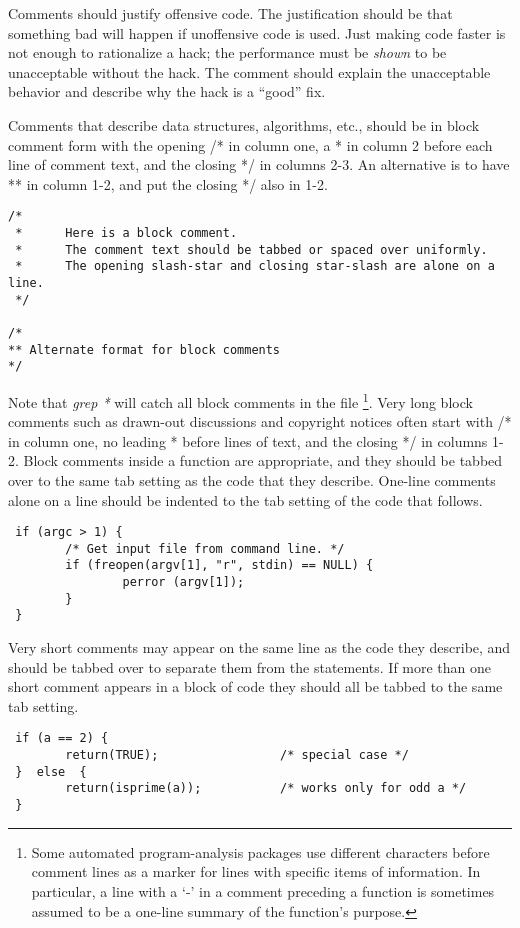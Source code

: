  Comments should justify offensive code. The justification should be that
something bad will happen if unoffensive code is used. Just making code faster
is not enough to rationalize a 
hack; the performance must be {\em shown} to be unacceptable without the hack.
The comment should explain the unacceptable behavior and describe why the hack
is a ``good'' fix. 

 Comments that describe data structures, algorithms, etc., should be in block
comment form with the opening /* in column one, a * in column 2 before each
line of comment text, and the closing */ in columns 2-3. An alternative is to
have ** in column 1-2, and put the closing */ also in 1-2. 

\begin{verbatim}
/*
 *      Here is a block comment.
 *      The comment text should be tabbed or spaced over uniformly.
 *      The opening slash-star and closing star-slash are alone on a line.
 */

/*
** Alternate format for block comments
*/ 
\end{verbatim}

 Note that {\em grep *} will catch all block comments in the file
\footnote{Some automated program-analysis packages use different characters
before comment lines as a marker for lines  with specific items of information.
In particular, a line with a `-' in a comment preceding a function is sometimes
assumed to be a one-line summary of the function's purpose.}. Very long
block comments such as drawn-out discussions and copyright notices often start
with /* in column one, no leading * before lines of text, and the closing */ in
columns 1-2. Block comments inside a function are appropriate, and they should
be tabbed over to the same tab setting as the code that they describe. One-line
comments alone on a line should be indented to the tab setting of the code that
follows.

\begin{verbatim}
 if (argc > 1) {
        /* Get input file from command line. */
        if (freopen(argv[1], "r", stdin) == NULL) {
                perror (argv[1]);
        }
 }
\end{verbatim}

 Very short comments may appear on the same line as the code they describe, and
should be tabbed over to separate them from the statements. If more than one
short comment appears in a block of code they should all be tabbed to the same
tab setting. 

\begin{verbatim}
 if (a == 2) {
        return(TRUE);                 /* special case */
 }  else  {
        return(isprime(a));           /* works only for odd a */
 }
\end{verbatim}

